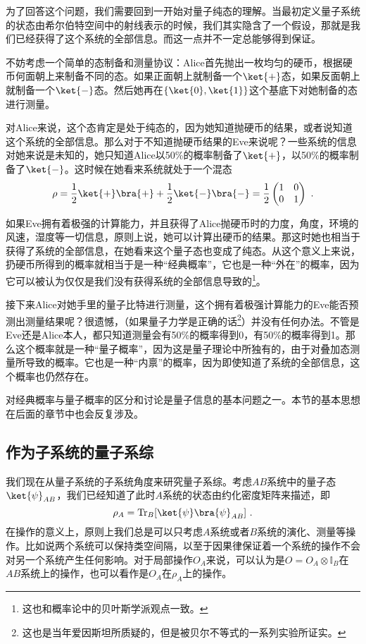 为了回答这个问题，我们需要回到一开始对量子纯态的理解。当最初定义量子系统的状态由希尔伯特空间中的射线表示的时候，我们其实隐含了一个假设，那就是我们已经获得了这个系统的全部信息。而这一点并不一定总能够得到保证。

不妨考虑一个简单的态制备和测量协议：Alice首先抛出一枚均匀的硬币，根据硬币何面朝上来制备不同的态。如果正面朝上就制备一个$\ket{+}$态，如果反面朝上就制备一个$\ket{-}$态。然后她再在$\{\ket{0},\ket{1}\}$这个基底下对她制备的态进行测量。

对Alice来说，这个态肯定是处于纯态的，因为她知道抛硬币的结果，或者说知道这个系统的全部信息。那么对于不知道抛硬币结果的Eve来说呢？一些系统的信息对她来说是未知的，她只知道Alice以50\%的概率制备了$\ket{+}$，以50\%的概率制备了$\ket{-}$。这时候在她看来系统就处于一个混态
\begin{equation}
\rho=\frac{1}{2}\ket{+}\bra{+}+\frac{1}{2}\ket{-}\bra{-}=\frac{1}{2}\begin{pmatrix}
1 & 0\\
0 & 1
\end{pmatrix}~.
\end{equation}

如果Eve拥有着极强的计算能力，并且获得了Alice抛硬币时的力度，角度，环境的风速，湿度等一切信息，原则上说，她可以计算出硬币的结果。那这时她也相当于获得了系统的全部信息，在她看来这个量子态也变成了纯态。从这个意义上来说，扔硬币所得到的概率就相当于是一种“经典概率”，它也是一种“外在”的概率，因为它可以被认为仅仅是我们没有获得系统的全部信息导致的\footnote{这也和概率论中的贝叶斯学派观点一致。}。

接下来Alice对她手里的量子比特进行测量，这个拥有着极强计算能力的Eve能否预测出测量结果呢？很遗憾，（如果量子力学是正确的话\footnote{这也是当年爱因斯坦所质疑的，但是被贝尔不等式的一系列实验所证实。}）并没有任何办法。不管是Eve还是Alice本人，都只知道测量会有50\%的概率得到0，有50\%的概率得到1。那么这个概率就是一种“量子概率”，因为这是量子理论中所独有的，由于对叠加态测量所导致的概率。它也是一种“内禀”的概率，因为即使知道了系统的全部信息，这个概率也仍然存在。

对经典概率与量子概率的区分和讨论是量子信息的基本问题之一。本节的基本思想在后面的章节中也会反复涉及。

\subsection{作为子系统的量子系综}


我们现在从量子系统的子系统角度来研究量子系综。考虑$AB$系统中的量子态$\ket{\psi}_{AB}$，我们已经知道了此时$A$系统的状态由约化密度矩阵来描述，即
\begin{equation}
\rho_A=\operatorname{Tr}_B[\ket{\psi}\bra{\psi}_{AB}]~.
\end{equation}
在操作的意义上，原则上我们总是可以只考虑$A$系统或者$B$系统的演化、测量等操作。比如说两个系统可以保持类空间隔，以至于因果律保证着一个系统的操作不会对另一个系统产生任何影响。对于局部操作$O_A$来说，可以认为是$O=O_A\otimes\mathbb{I}_B$在$AB$系统上的操作，也可以看作是$O_A$在$\rho_A$上的操作。

